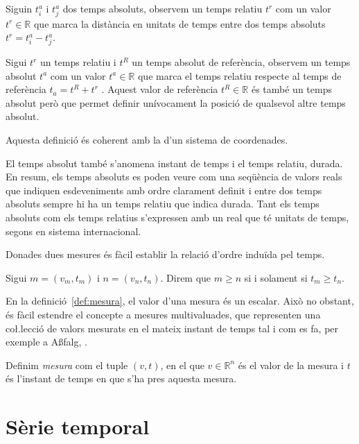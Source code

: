 \begin{definition}[Temps]
  \label{def:temps}
  Siguin $t^a_i$ i $t^a_j$ dos temps absoluts, observem un temps
  relatiu $t^r$ com un valor $t^r \in \mathbb{R}$ que marca la
  distància en unitats de temps entre dos temps absoluts $t^r = t^a_i
  - t^a_j$.
  
  Sigui $t^r$ un temps relatiu i $t^{R}$ un temps absolut de
  referència, observem un temps absolut $t^a$ com un valor $t^a
  \in\mathbb{R}$ que marca el temps relatiu respecte al temps de
  referència $t_a= t^{R} + t^r$ . Aquest valor de referència
  $t^{R}\in\mathbb{R}$ és també un temps absolut però que permet
  definir unívocament la posició de qualsevol altre temps absolut.

  Aquesta definició és coherent amb la d'un sistema de coordenades.
\end{definition}

El temps absolut també s'anomena instant de temps i el temps relatiu, durada.
En resum, els temps absoluts es poden veure com una seqüència de valors reals que indiquen esdeveniments amb ordre clarament definit i entre dos temps absoluts sempre hi ha un temps relatiu que indica durada. Tant els temps absoluts com els temps relatius s'expressen amb un real que té unitats de temps, segons en sistema internacional. 





Donades dues mesures és fàcil establir la relació d'ordre induïda pel
temps.

\begin{definition}
  \label{def:relacio-ordre}
  Sigui $m=(v_m,t_m)$ i $n=(v_n,t_n)$. Direm que $m\geq n$ si i solament
  si $t_m\geq t_n$.
\end{definition}

En la definició~\ref{def:mesura}, el valor d'una mesura és un
escalar. Això no obstant, és fàcil estendre el concepte a mesures
multivaluades, que representen una co\l.lecció de valors
mesurats en el mateix instant de temps tal i com es fa, per exemple a
A\ss falg, \cite{assfalg08:_advan_analy_temp}.

\begin{definition}
  Definim \emph{mesura} com el tuple $(v,t)$, en el que
  $v\in\mathbb{R}^n$ és el valor de la mesura i $t$ és l'instant de
  temps en que s'ha pres aquesta mesura.
\end{definition}



\section{Sèrie temporal}
\label{sec:model:serietemporal}

